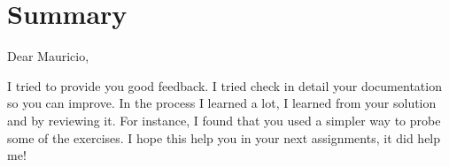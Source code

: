 \documentclass[11 pt]{article}
\begin{document}
\section{Summary}
Dear Mauricio, 

I tried to provide you good feedback. I tried check in detail your documentation so you can improve. In the process I learned a lot, I learned from your solution and by reviewing it. For instance, I found that you used a simpler way to probe some of the exercises. I hope this help you in your next assignments, it did help me! 
\end{document}
